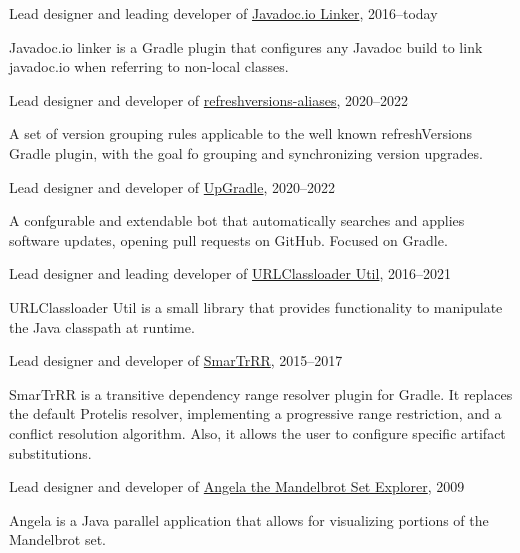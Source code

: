 \documentclass[10pt]{article}
\newenvironment{innerlist}[1][\enskip\textbullet]%
        {\begin{compactitem}[#1]}{\end{compactitem}}
\newcommand{\halfblankline}{\quad\vspace{-0.5\baselineskip}\pagebreak[3]}
\begin{document}
Lead designer and leading developer of \href{https://github.com/DanySK/javadoc.io-linker}{Javadoc.io Linker}, 2016--today
\begin{innerlist}
    \item Javadoc.io linker is a Gradle plugin that configures any Javadoc build to link javadoc.io when referring to non-local classes.
\end{innerlist}
\halfblankline

Lead designer and developer of \href{https://github.com/DanySK/refreshversions-aliases}{refreshversions-aliases}, 2020--2022
\begin{innerlist}
    \item A set of version grouping rules applicable to the well known refreshVersions Gradle plugin,
    with the goal fo grouping and synchronizing version upgrades.
\end{innerlist}
\halfblankline

Lead designer and developer of \href{https://github.com/DanySK/upgradle}{UpGradle}, 2020--2022
\begin{innerlist}
    \item A confgurable and extendable bot that automatically searches and applies software updates,
        opening pull requests on GitHub. Focused on Gradle.
\end{innerlist}
\halfblankline

Lead designer and leading developer of \href{https://github.com/DanySK/urlclassloader-util}{URLClassloader Util}, 2016--2021
\begin{innerlist}
    \item URLClassloader Util is a small library that provides functionality to manipulate the Java classpath at runtime.
\end{innerlist}
\halfblankline

Lead designer and developer of \href{https://github.com/DanySK/SmarTrRR}{SmarTrRR}, 2015--2017
\begin{innerlist}
    \item SmarTrRR is a transitive dependency range resolver plugin for Gradle. It replaces the default Protelis resolver, implementing a progressive range restriction, and a conflict resolution algorithm. Also, it allows the user to configure specific artifact substitutions.
\end{innerlist}
\halfblankline

Lead designer and developer of \href{https://sourceforge.net/projects/mandelbrot/}{Angela the Mandelbrot Set Explorer}, 2009
\begin{innerlist}
  \item Angela is a Java parallel application that allows for visualizing portions of the Mandelbrot set.
\end{innerlist}
\halfblankline
\end{document}
